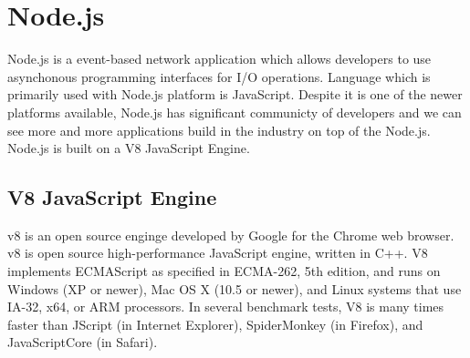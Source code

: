 \section{Node.js} %
\label{sec:node_js}
Node.js is a event-based network application which allows developers to use asynchonous programming interfaces for I/O operations. Language which is primarily used with Node.js platform is JavaScript. Despite it is one of the newer platforms available, Node.js has significant communicty of developers and we can see more and more applications build in the industry on top of the Node.js. Node.js is built on a V8 JavaScript Engine.
\subsection{V8 JavaScript Engine} %
\label{sub:v8_javascript_engine}
\glsdesc{v8} is an open source enginge developed by Google for the Chrome web browser. \gls{v8} is open source high-performance JavaScript engine, written in C++. V8 implements ECMAScript as specified in ECMA-262, 5th edition, and runs on Windows (XP or newer), Mac OS X (10.5 or newer), and Linux systems that use IA-32, x64, or ARM processors. In several benchmark tests, V8 is many times faster than JScript (in Internet Explorer), SpiderMonkey (in Firefox), and JavaScriptCore (in Safari).\cite{google_v8}
